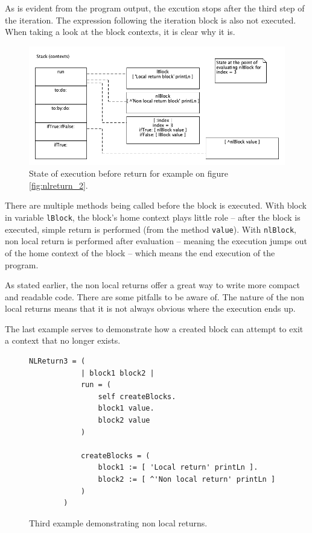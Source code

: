 \documentclass[thesis=M,english]{FITthesis}[2019/12/23]
\begin{document}
As is evident from the program output, the excution stops after the third step of the iteration. The expression
following the iteration block is also not executed. When taking a look at the block contexts, it is clear why it is.

\begin{figure}[h!]
	\centering
	\includegraphics[width=\linewidth]{media/nlreturn_ex2.png}
	\caption{State of execution before return for example on figure \ref{fig:nlreturn_2}.}
	\label{fig:nlreturn_2_ctx}
\end{figure}

There are multiple methods being called before the block is executed. With block in variable \texttt{lBlock}, the
block's home context plays little role -- after the block is executed, simple return is performed (from the method
\texttt{value}). With \texttt{nlBlock}, non local return is performed after evaluation -- meaning the execution jumps
out of the home context of the block -- which means the end execution of the program.

As stated earlier, the non local returns offer a great way to write more compact and readable code. There are some
pitfalls to be aware of. The nature of the non local returns means that it is not always obvious where the execution
ends up.

The last example serves to demonstrate how a created block can attempt to exit a context that no longer exists.

\begin{figure}[h!]
	\centering
	\begin{lstlisting}[language=Smalltalk]
		NLReturn3 = (
			| block1 block2 |
			run = (
				self createBlocks.
				block1 value.
				block2 value
			)

			createBlocks = (
				block1 := [ 'Local return' printLn ].
				block2 := [ ^'Non local return' printLn ]
			)
		)
	\end{lstlisting}
	\caption{Third example demonstrating non local returns.}
	\label{fig:nlreturn_3}
\end{figure}
\end{document}
